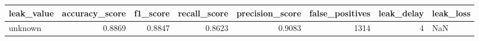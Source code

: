 \begin{tabular}{lrrrrrrl}
\toprule
leak\_value & accuracy\_score & f1\_score & recall\_score & precision\_score & false\_positives & leak\_delay & leak\_loss \\
\midrule
unknown & 0.8869 & 0.8847 & 0.8623 & 0.9083 & 1314 & 4 & NaN \\
\bottomrule
\end{tabular}
